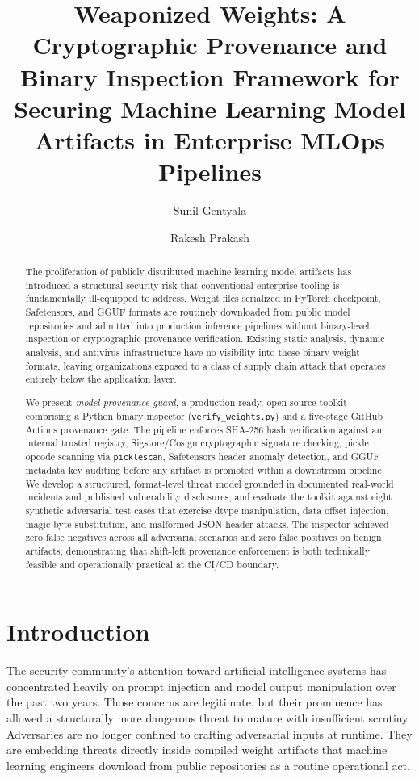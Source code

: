 \documentclass[sigconf,review]{acmart}
\author{Sunil Gentyala}
\affiliation{%
  \institution{HCLTech}
  \department{Cybersecurity and AI Security Practice}
  \city{Dallas}
  \state{TX}
  \country{USA}
}
\author{Rakesh Prakash}
\affiliation{%
  \institution{University of Colorado Boulder}
  \department{Department of Computer Science}
  \city{Boulder}
  \state{CO}
  \country{USA}
}
\title{Weaponized Weights: A Cryptographic Provenance and Binary Inspection
  Framework for Securing Machine Learning Model Artifacts in Enterprise
  MLOps Pipelines}
\begin{document}
\begin{abstract}
The proliferation of publicly distributed machine learning model artifacts
has introduced a structural security risk that conventional enterprise
tooling is fundamentally ill-equipped to address. Weight files serialized in
PyTorch checkpoint, Safetensors, and GGUF formats are routinely downloaded
from public model repositories and admitted into production inference
pipelines without binary-level inspection or cryptographic provenance
verification. Existing static analysis, dynamic analysis, and antivirus
infrastructure have no visibility into these binary weight formats, leaving
organizations exposed to a class of supply chain attack that operates
entirely below the application layer.

We present \textit{model-provenance-guard}, a production-ready, open-source
toolkit comprising a Python binary inspector (\texttt{verify\_weights.py})
and a five-stage GitHub Actions provenance gate. The pipeline enforces
SHA-256 hash verification against an internal trusted registry, Sigstore/Cosign
cryptographic signature checking, pickle opcode scanning via
\texttt{picklescan}, Safetensors header anomaly detection, and GGUF metadata
key auditing before any artifact is promoted within a downstream pipeline.
We develop a structured, format-level threat model grounded in documented
real-world incidents and published vulnerability disclosures, and evaluate
the toolkit against eight synthetic adversarial test cases that exercise
dtype manipulation, data offset injection, magic byte substitution, and
malformed JSON header attacks. The inspector achieved zero false negatives
across all adversarial scenarios and zero false positives on benign artifacts,
demonstrating that shift-left provenance enforcement is both technically
feasible and operationally practical at the CI/CD boundary.
\end{abstract}

\maketitle

\section{Introduction}

The security community's attention toward artificial intelligence systems
has concentrated heavily on prompt injection and model output manipulation
over the past two years. Those concerns are legitimate, but their prominence
has allowed a structurally more dangerous threat to mature with insufficient
scrutiny. Adversaries are no longer confined to crafting adversarial inputs
at runtime. They are embedding threats directly inside compiled weight
artifacts that machine learning engineers download from public repositories
as a routine operational act.
\end{document}
